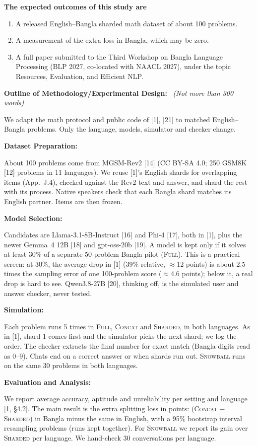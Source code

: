 \documentclass[11pt,a4paper]{article}
\newcommand{\formitem}[3]{%
  \par\vspace{4pt}\noindent\makebox[1.6em][l]{\textbf{#1.}}\textbf{#2}%
  \if\relax\detokenize{#3}\relax\else\ \textit{(#3)}\fi\par}
\newcommand{\subhead}[1]{\par\vspace{2pt}\textbf{#1}\par\vspace{-3pt}}
\begin{document}
\textbf{The expected outcomes of this study are}
\begin{enumerate}[leftmargin=2em,itemsep=1pt,topsep=2pt]
\item A released English--Bangla sharded math dataset of about 100 problems.
\item A measurement of the extra loss in Bangla, which may be zero.
\item A full paper submitted to the Third Workshop on Bangla Language Processing (BLP 2027, co-located with NAACL 2027), under the topic Resources, Evaluation, and Efficient NLP.
\end{enumerate}

\formitem{10}{Outline of Methodology/Experimental Design:}{Not more than 300 words}

We adapt the math protocol and public code of [1], [21] to matched English--Bangla problems. Only the language, models, simulator and checker change.

\subhead{Dataset Preparation:}
About 100 problems come from MGSM-Rev2 [14] (CC BY-SA 4.0; 250 GSM8K [12] problems in 11 languages). We reuse [1]'s English shards for overlapping items (App.~J.4), checked against the Rev2 text and answer, and shard the rest with its process. Native speakers check that each Bangla shard matches its English partner. Items are then frozen.
\figdata

\subhead{Model Selection:}
Candidates are Llama-3.1-8B-Instruct [16] and Phi-4 [17], both in [1], plus the newer Gemma~4 12B [18] and gpt-oss-20b [19]. A model is kept only if it solves at least 30\% of a separate 50-problem Bangla pilot (\textsc{Full}). This is a practical screen: at 30\%, the average drop in [1] (39\% relative, $\approx$12 points) is about 2.5 times the sampling error of one 100-problem score ($\approx$4.6 points); below it, a real drop is hard to see. Qwen3.8-27B [20], thinking off, is the simulated user and answer checker, never tested.
\figmodels

\subhead{Simulation:}
Each problem runs 5 times in \textsc{Full}, \textsc{Concat} and \textsc{Sharded}, in both languages. As in [1], shard 1 comes first and the simulator picks the next shard; we log the order. The checker extracts the final number for exact match (Bangla digits read as 0--9). Chats end on a correct answer or when shards run out. \textsc{Snowball} runs on the same 30 problems in both languages.
\figsim

\subhead{Evaluation and Analysis:}
We report average accuracy, aptitude and unreliability per setting and language [1, \S4.2]. The main result is the extra splitting loss in points: (\textsc{Concat} $-$ \textsc{Sharded}) in Bangla minus the same in English, with a 95\% bootstrap interval resampling problems (runs kept together). For \textsc{Snowball} we report its gain over \textsc{Sharded} per language. We hand-check 30 conversations per language.
\figeval
\end{document}
